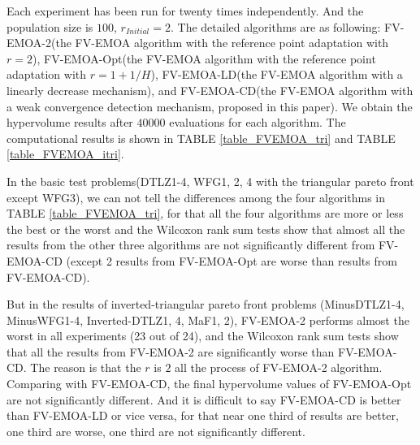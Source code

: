 \documentclass[conference]{IEEEtran}
\begin{document}
Each experiment has been run for twenty times independently. 
And the population size is $100$, $r_{Initial}=2$.
The detailed algorithms are as following: 
FV-EMOA-2(the FV-EMOA\cite{FVEMOA} algorithm with the reference point adaptation with $r=2$),
FV-EMOA-Opt(the FV-EMOA algorithm with the reference point adaptation with $r=1+1/H$),
FV-EMOA-LD(the FV-EMOA algorithm with a linearly decrease mechanism),
and FV-EMOA-CD(the FV-EMOA algorithm with a weak convergence detection mechanism, proposed in this paper).
We obtain the hypervolume results after $40000$ evaluations for each algorithm. 
The computational results is shown in TABLE \ref{table_FVEMOA_tri} and TABLE \ref{table_FVEMOA_itri}. 

In the basic test problems(DTLZ1-4, WFG1, 2, 4 with the triangular pareto front except WFG3), 
we can not tell the differences among the four algorithms in TABLE \ref{table_FVEMOA_tri},
for that all the four algorithms are more or less the best or the worst 
and the Wilcoxon rank sum tests show that almost all the results from the other three algorithms are not significantly different from FV-EMOA-CD
(except 2 results from FV-EMOA-Opt are worse than results from FV-EMOA-CD). 

But in the results of inverted-triangular pareto front problems (MinusDTLZ1-4, MinusWFG1-4, Inverted-DTLZ1, 4, MaF1, 2), 
FV-EMOA-2 performs almost the worst in all experiments (23 out of 24), 
and the Wilcoxon rank sum tests show that all the results from FV-EMOA-2 are significantly worse than FV-EMOA-CD. 
The reason is that the $r$ is $2$ all the process of FV-EMOA-2 algorithm. 
Comparing with FV-EMOA-CD, the final hypervolume values of FV-EMOA-Opt are not significantly different. 
And it is difficult to say FV-EMOA-CD is better than FV-EMOA-LD or vice versa,
for that near one third of results are better, one third are worse, one third are not significantly different. 

% 
\end{document}
